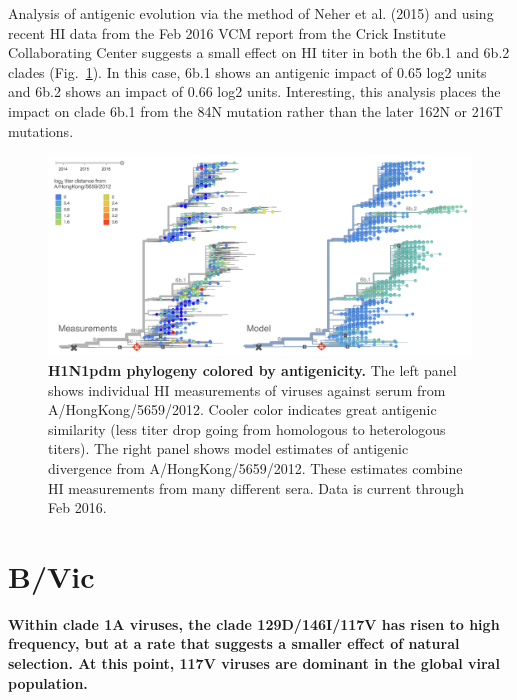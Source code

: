 \documentclass[11pt,oneside,letterpaper]{article}
\begin{document}
\pagebreak

Analysis of antigenic evolution via the method of Neher et al. (2015) \cite{neher2015prediction} and using recent HI data from the Feb 2016 VCM report \cite{crickfeb2016report} from the Crick Institute Collaborating Center suggests a small effect on HI titer in both the 6b.1 and 6b.2 clades (Fig.\ \ref{H1N1pdm_HI}). In this case, 6b.1 shows an antigenic impact of 0.65 log2 units and 6b.2 shows an impact of 0.66 log2 units. Interesting, this analysis places the impact on clade 6b.1 from the 84N mutation rather than the later 162N or 216T mutations.

\begin{figure}[h!]
	\centering
	\includegraphics[width=1.0\textwidth]{../figures/sep-2016/H1N1pdm_HI.png}
	\caption{\textbf{H1N1pdm phylogeny colored by antigenicity.}
	The left panel shows individual HI measurements of viruses against serum from A/HongKong/5659/2012.
	Cooler color indicates great antigenic similarity (less titer drop going from homologous to heterologous titers).
	The right panel shows model estimates of antigenic divergence from A/HongKong/5659/2012.
	These estimates combine HI measurements from many different sera.
	Data is current through Feb 2016.
	}
	\label{H1N1pdm_HI}
\end{figure}

\clearpage
\pagebreak

\section*{B/Vic}

\textbf{Within clade 1A viruses, the clade 129D/146I/117V has risen to high frequency, but at a rate that suggests a smaller effect of natural selection. At this point, 117V viruses are dominant in the global viral population.}
\end{document}
